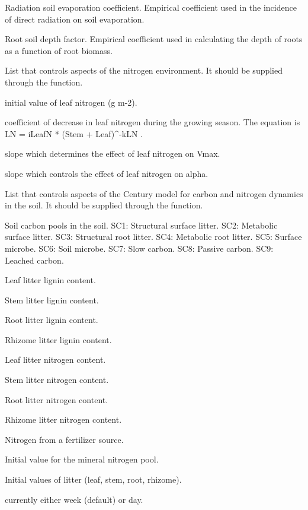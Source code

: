\documentclass[letterpaper]{book}
\begin{document}
\begin{Arguments}
\begin{ldescription}
 Radiation soil evaporation coefficient.
Empirical coefficient used in the incidence of direct
radiation on soil evaporation.

 Root soil depth factor. Empirical coefficient
used in calculating the depth of roots as a function of
root biomass.

\item[\code{nitroControl}] List that controls aspects of the
nitrogen environment. It should be supplied through the
 function.

 initial value of leaf nitrogen (g m-2).

 coefficient of decrease in leaf nitrogen
during the growing season. The equation is LN = iLeafN *
(Stem + Leaf)\textasciicircum{}-kLN .

 slope which determines the effect of leaf
nitrogen on Vmax.

 slope which controls the effect of leaf
nitrogen on alpha.

\item[\code{centuryControl}] List that controls aspects of the
Century model for carbon and nitrogen dynamics in the
soil. It should be supplied through the
 function.

 Soil carbon pools in the soil.  SC1:
Structural surface litter.  SC2: Metabolic surface
litter.  SC3: Structural root litter.  SC4: Metabolic
root litter.  SC5: Surface microbe.  SC6: Soil microbe.
SC7: Slow carbon.  SC8: Passive carbon.  SC9: Leached
carbon.

 Leaf litter lignin content.

 Stem litter lignin content.

 Root litter lignin content.

 Rhizome litter lignin content.

 Leaf litter nitrogen content.

 Stem litter nitrogen content.

 Root litter nitrogen content.

 Rhizome litter nitrogen content.

 Nitrogen from a fertilizer source.

 Initial value for the mineral nitrogen pool.

 Initial values of litter (leaf, stem, root,
rhizome).

 currently either week (default) or day.
\end{ldescription}
\end{Arguments}
\end{document}
